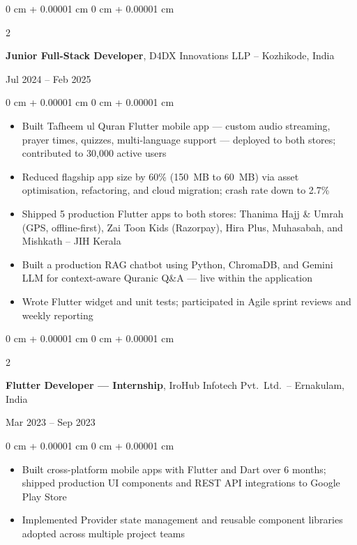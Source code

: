 \documentclass[10pt, a4paper]{article}
\newenvironment{highlights}{
    \begin{itemize}[
        topsep=0.08 cm,
        parsep=0.06 cm,
        partopsep=0pt,
        itemsep=0pt,
        leftmargin=0 cm + 10pt
    ]
}{
    \end{itemize}
}
\newenvironment{onecolentry}{
    \begin{adjustwidth}{
        0 cm + 0.00001 cm
    }{
        0 cm + 0.00001 cm
    }
}{
    \end{adjustwidth}
}
\newenvironment{twocolentry}[2][]{
    \onecolentry
    \def\secondColumn{#2}
    \setcolumnwidth{\fill, 4.8 cm}
    \begin{paracol}{2}
}{
    \switchcolumn \raggedleft \secondColumn
    \end{paracol}
    \endonecolentry}
\begin{document}
    \begin{twocolentry}{
        Jul 2024 -- Feb 2025
    }
        \textbf{Junior Full-Stack Developer}, D4DX Innovations LLP -- Kozhikode, India
    \end{twocolentry}
    \vspace{0.08 cm}
    \begin{onecolentry}
        \begin{highlights}
            \item Built Tafheem ul Quran Flutter mobile app --- custom audio streaming, prayer times, quizzes, multi-language support --- deployed to both stores; contributed to 30,000 active users
            \item Reduced flagship app size by 60\% (150~MB to 60~MB) via asset optimisation, refactoring, and cloud migration; crash rate down to 2.7\%
            \item Shipped 5 production Flutter apps to both stores: Thanima Hajj \& Umrah (GPS, offline-first), Zai Toon Kids (Razorpay), Hira Plus, Muhasabah, and Mishkath -- JIH Kerala
            \item Built a production RAG chatbot using Python, ChromaDB, and Gemini LLM for context-aware Quranic Q\&A --- live within the application
            \item Wrote Flutter widget and unit tests; participated in Agile sprint reviews and weekly reporting
        \end{highlights}
    \end{onecolentry}

    \vspace{0.15 cm}

    \begin{twocolentry}{
        Mar 2023 -- Sep 2023
    }
        \textbf{Flutter Developer --- Internship}, IroHub Infotech Pvt.\ Ltd.\ -- Ernakulam, India
    \end{twocolentry}
    \vspace{0.08 cm}
    \begin{onecolentry}
        \begin{highlights}
            \item Built cross-platform mobile apps with Flutter and Dart over 6 months; shipped production UI components and REST API integrations to Google Play Store
            \item Implemented Provider state management and reusable component libraries adopted across multiple project teams
        \end{highlights}
    \end{onecolentry}
\end{document}
